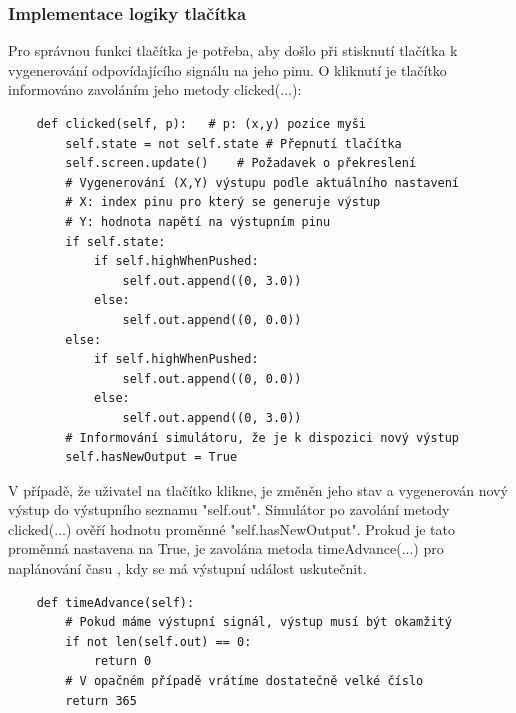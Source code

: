 \subsubsection{Implementace logiky tlačítka}

Pro správnou funkci tlačítka je potřeba, aby došlo při stisknutí tlačítka k vygenerování odpovídajícího signálu na jeho pinu. O kliknutí je tlačítko informováno zavoláním jeho metody clicked(...):

\begin{lstlisting}
	def clicked(self, p):	# p: (x,y) pozice myši
		self.state = not self.state	# Přepnutí tlačítka
		self.screen.update()	# Požadavek o překreslení
		# Vygenerování (X,Y) výstupu podle aktuálního nastavení
		# X: index pinu pro který se generuje výstup
		# Y: hodnota napětí na výstupním pinu
		if self.state:
			if self.highWhenPushed:
				self.out.append((0, 3.0))
			else:
				self.out.append((0, 0.0))
		else:
			if self.highWhenPushed:
				self.out.append((0, 0.0))
			else:
				self.out.append((0, 3.0))
		# Informování simulátoru, že je k dispozici nový výstup
		self.hasNewOutput = True
\end{lstlisting}

V případě, že uživatel na tlačítko klikne, je změněn jeho stav a vygenerován nový výstup do výstupního seznamu "self.out". Simulátor po zavolání metody clicked(...) ověří hodnotu proměnné "self.hasNewOutput". Prokud je tato proměnná nastavena na True, je zavolána metoda timeAdvance(...) pro naplánování času , kdy se má výstupní událost uskutečnit.

\begin{lstlisting}
	def timeAdvance(self):
		# Pokud máme výstupní signál, výstup musí být okamžitý
		if not len(self.out) == 0:
			return 0
		# V opačném případě vrátíme dostatečně velké číslo
		return 365
\end{lstlisting}

